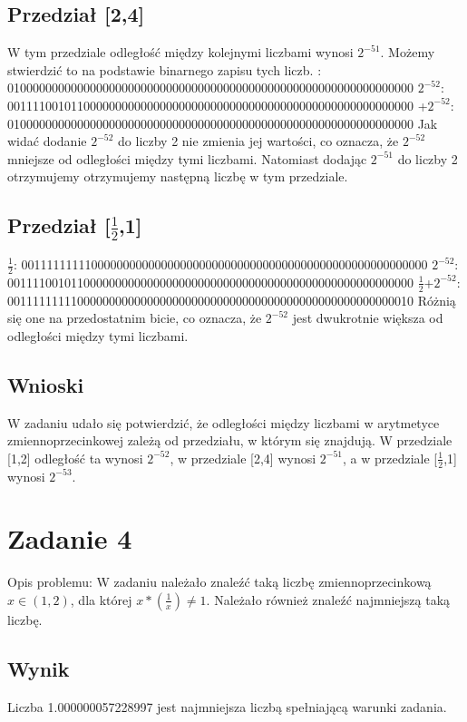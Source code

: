 \documentclass{article}
\begin{document}
\subsection{Przedział [2,4]}
W tym przedziale odległość między kolejnymi liczbami wynosi $2^{-51}$. Możemy stwierdzić to na podstawie binarnego zapisu tych liczb. : 0100000000000000000000000000000000000000000000000000000000000000\newline
$2^{-52}$: 0011110010110000000000000000000000000000000000000000000000000000 +$2^{-52}$: 0100000000000000000000000000000000000000000000000000000000000000 \newline
Jak widać dodanie $2^{-52}$ do liczby 2 nie zmienia jej wartości, co oznacza, że $2^{-52}$ mniejsze od odległości między tymi liczbami. Natomiast dodając $2^{-51}$ do liczby 2 otrzymujemy otrzymujemy następną liczbę w tym przedziale.
\subsection{Przedział [$\frac{1}{2}$,1]}
$\frac{1}{2}$: 0011111111100000000000000000000000000000000000000000000000000000 \newline
$2^{-52}$: 0011110010110000000000000000000000000000000000000000000000000000 \newline
$\frac{1}{2}$+$2^{-52}$: 0011111111100000000000000000000000000000000000000000000000000010 \newline
Różnią się one na przedostatnim bicie, co oznacza, że $2^{-52}$ jest dwukrotnie większa od odległości między tymi liczbami.
\subsection{Wnioski}
W zadaniu udało się potwierdzić, że odległości między liczbami w arytmetyce zmiennoprzecinkowej zależą od przedziału, w którym się znajdują. W przedziale [1,2] odległość ta wynosi $2^{-52}$, w przedziale [2,4] wynosi $2^{-51}$, a w przedziale [$\frac{1}{2}$,1] wynosi $2^{-53}$.
\section{Zadanie 4}
Opis problemu: \newline
W zadaniu należało znaleźć taką liczbę zmiennoprzecinkową $x \in (1,2)$, dla której $x*(\frac{1}{x}) \ne 1$. Należało również znaleźć najmniejszą taką liczbę.
\subsection{Wynik}
Liczba 1.000000057228997 jest najmniejsza liczbą spełniającą warunki zadania.
\end{document}
